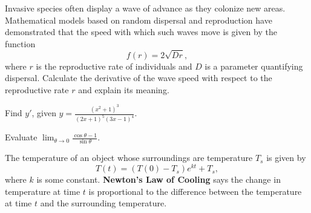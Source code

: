\documentclass[12pt, addpoints]{exam/exam}
\newcommand{\1}{^{-1}}
\theoremstyle{plain}
\begin{document}
\begin{questions}
	
\vfill	

\newpage
\question[15] %
Invasive species often display a wave of advance as they colonize new areas.  Mathematical models based on random dispersal and reproduction have demonstrated that the speed with which such waves move is given by the function 
\[
f(r)=2\sqrt{Dr},
\]
where $r$ is the reproductive rate of individuals and $D$ is a parameter quantifying dispersal.  Calculate the derivative of the wave speed with respect to the reproductive rate $r$ and explain its meaning.

\newpage
\question[10] %
Find $y'$, given %
$y=\frac{(x^2+1)^3}{(2x+1)^5(3x-1)^4}$.
\vfill

\question[10] %
Evaluate $\lim_{\theta\to 0}\frac{\cos{\theta}-1}{\sin{\theta}}$.	
\vfill

\newpage
\question %
The temperature of an object whose surroundings are temperature $T_s$ is given by
\[
T(t)=(T(0)-T_s)e^{kt}+T_s,
\]
where $k$ is some constant.  \textbf{Newton's Law of Cooling} says the change in temperature at time $t$ is proportional to the difference between the temperature at time $t$ and the surrounding temperature. 
\begin{parts}

\end{parts}
\end{questions}
\end{document}
